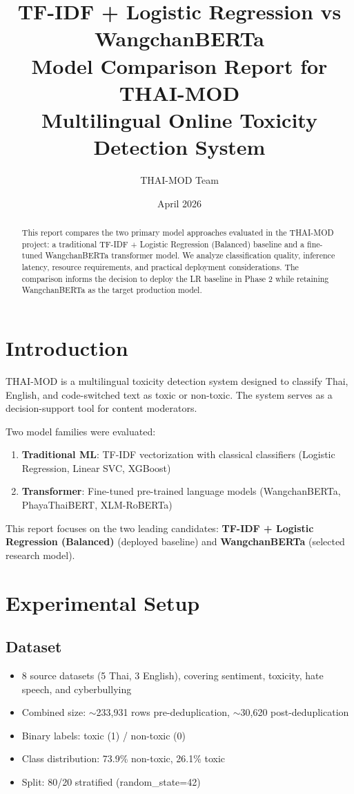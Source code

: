 \documentclass[11pt,a4paper]{article}
\title{%
    \textbf{TF-IDF + Logistic Regression vs WangchanBERTa} \\[0.5em]
    \large Model Comparison Report for THAI-MOD \\
    Multilingual Online Toxicity Detection System
}
\author{THAI-MOD Team}
\date{April 2026}
\begin{document}
\maketitle

\begin{abstract}
This report compares the two primary model approaches evaluated in the THAI-MOD project:
a traditional TF-IDF + Logistic Regression (Balanced) baseline and a fine-tuned WangchanBERTa
transformer model. We analyze classification quality, inference latency, resource requirements,
and practical deployment considerations. The comparison informs the decision to deploy the LR
baseline in Phase 2 while retaining WangchanBERTa as the target production model.
\end{abstract}

\tableofcontents
\clearpage

\section{Introduction}

THAI-MOD is a multilingual toxicity detection system designed to classify Thai, English, and
code-switched text as toxic or non-toxic. The system serves as a decision-support tool for
content moderators.

Two model families were evaluated:
\begin{enumerate}
    \item \textbf{Traditional ML}: TF-IDF vectorization with classical classifiers (Logistic Regression, Linear SVC, XGBoost)
    \item \textbf{Transformer}: Fine-tuned pre-trained language models (WangchanBERTa, PhayaThaiBERT, XLM-RoBERTa)
\end{enumerate}

This report focuses on the two leading candidates: \textbf{TF-IDF + Logistic Regression (Balanced)}
(deployed baseline) and \textbf{WangchanBERTa} (selected research model).

\section{Experimental Setup}

\subsection{Dataset}
\begin{itemize}[nosep]
    \item 8 source datasets (5 Thai, 3 English), covering sentiment, toxicity, hate speech, and cyberbullying
    \item Combined size: $\sim$233,931 rows pre-deduplication, $\sim$30,620 post-deduplication
    \item Binary labels: toxic (1) / non-toxic (0)
    \item Class distribution: 73.9\% non-toxic, 26.1\% toxic
    \item Split: 80/20 stratified (random\_state=42)
\end{itemize}
\end{document}
